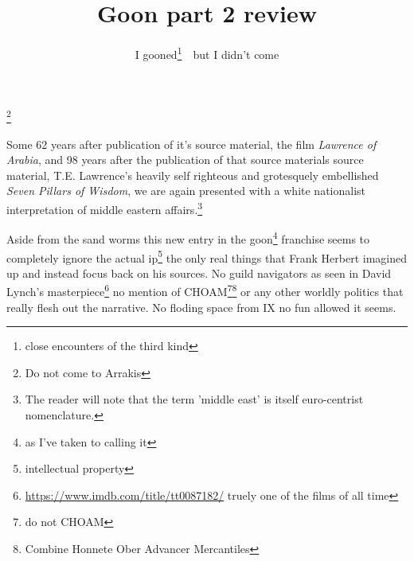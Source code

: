 \documentclass{article}
\title{Goon part 2 review}
\author{I gooned\footnote{close encounters of the third kind}\ \ but I didn't come}
\begin{document}
\maketitle

\noindent{}\footnote{Do not come to Arrakis}

\hfill \break

Some 62 years after publication of it's source material, the film \textit{Lawrence of Arabia}, and 98 years after the publication of that source materials source material, T.E. Lawrence's heavily self righteous and grotesquely embellished \textit{Seven Pillars of Wisdom}, we are again presented with a white nationalist interpretation of middle eastern affairs.\footnote{The reader will note that the term 'middle east' is itself euro-centrist nomenclature.}

Aside from the sand worms this new entry in the goon\footnote{as I've taken to calling it} franchise seems to completely ignore the actual ip\footnote{intellectual property} the only real things that Frank Herbert imagined up and instead focus back on his sources. No guild navigators as seen in David Lynch's masterpiece\footnote{\href{https://www.imdb.com/title/tt0087182/}{https://www.imdb.com/title/tt0087182/} truely one of the films of all time} no mention of CHOAM\footnote{do not CHOAM}\footnote{Combine Honnete Ober Advancer Mercantiles} or any other worldly politics that really flesh out the narrative. No floding space from IX no fun allowed it seems.
\end{document}
